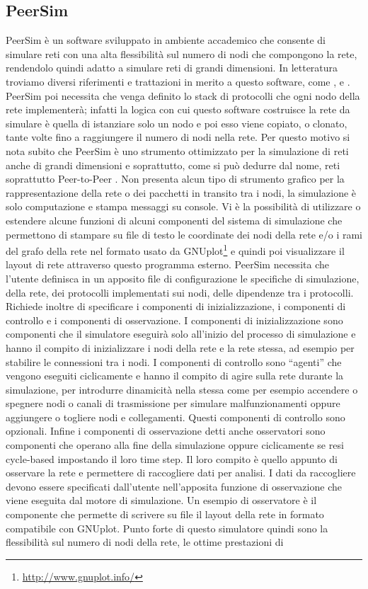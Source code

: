 \subsection{PeerSim}
PeerSim è un software sviluppato in ambiente accademico che consente di simulare reti con una alta flessibilità sul numero di nodi che compongono la rete, rendendolo quindi adatto a simulare reti di grandi dimensioni. In letteratura troviamo diversi riferimenti e trattazioni in merito a questo software, come \cite{montresor2010-peersim}, \cite{montresor2009-peersim_scalabile} e \cite{montresor2009-peersimP2P}. PeerSim poi necessita che venga definito lo stack di protocolli che ogni nodo della rete implementerà; infatti la logica con cui questo software costruisce la rete da simulare è quella di istanziare solo un nodo e poi esso viene copiato, o clonato, tante volte fino a raggiungere il numero di nodi nella rete. Per questo motivo si nota subito  che PeerSim è uno strumento ottimizzato per la simulazione di reti anche di grandi dimensioni e soprattutto, come si può dedurre dal nome, reti soprattutto Peer-to-Peer \cite{montresor2009-peersimP2P}. Non presenta alcun tipo di strumento grafico per la rappresentazione della rete o dei pacchetti in transito tra i nodi, la simulazione è solo computazione e stampa messaggi su console. Vi è la possibilità di utilizzare o estendere alcune funzioni di alcuni componenti del sistema di simulazione che permettono di stampare su file di testo le coordinate dei nodi della rete e/o i rami del grafo della rete nel formato usato da GNUplot\footnote{\url{http://www.gnuplot.info/}} e quindi poi visualizzare il layout di rete attraverso questo programma esterno. PeerSim necessita che l'utente definisca in un apposito file di configurazione le specifiche di simulazione, della rete, dei protocolli implementati sui nodi, delle dipendenze tra i protocolli. Richiede inoltre di specificare i componenti di inizializzazione, i componenti di controllo e i componenti di osservazione. I componenti di inizializzazione sono componenti che il simulatore eseguirà solo all'inizio del processo di simulazione e hanno il compito di inizializzare i nodi della rete e la rete stessa, ad esempio per stabilire le connessioni tra i nodi. I componenti di controllo sono “agenti” che vengono eseguiti ciclicamente e hanno il compito di agire sulla rete durante la simulazione, per introdurre dinamicità nella stessa come per esempio accendere o spegnere nodi o canali di trasmissione per simulare malfunzionamenti oppure aggiungere o togliere nodi e collegamenti. Questi componenti di controllo sono opzionali. Infine i componenti di osservazione detti anche osservatori sono componenti che operano alla fine della simulazione oppure ciclicamente se resi cycle-based impostando il loro time step. Il loro compito è quello appunto di osservare la rete e permettere di raccogliere dati per analisi. I dati da raccogliere devono essere specificati dall'utente nell'apposita funzione di osservazione che viene eseguita dal motore di simulazione. Un esempio di osservatore è il componente che permette di scrivere su file il layout della rete in formato compatibile con GNUplot. Punto forte di questo simulatore quindi sono la flessibilità sul numero di nodi della rete, le ottime prestazioni di 